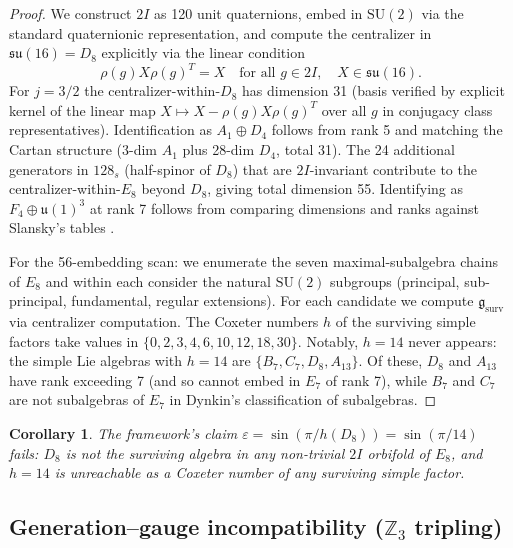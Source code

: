 \documentclass[11pt,a4paper]{amsart}
\newtheorem{corollary}[theorem]{Corollary}
\theoremstyle{definition}
\theoremstyle{remark}
\newcommand{\SU}{\mathrm{SU}}
\newcommand{\bbZ}{\mathbb{Z}}
\newcommand{\frakg}{\mathfrak{g}}
\newcommand{\fraks}{\mathfrak{s}}
\newcommand{\fraku}{\mathfrak{u}}
\begin{document}
\begin{proof}
We construct $2I$ as 120 unit quaternions, embed in $\SU(2)$ via the standard
quaternionic representation, and compute the centralizer in $\fraks\fraku(16) = D_8$
explicitly via the linear condition
\[ \rho(g) X \rho(g)^T = X \quad \text{for all } g \in 2I, \quad X \in \fraks\fraku(16). \]
For $j = 3/2$ the centralizer-within-$D_8$ has dimension 31 (basis verified by
explicit kernel of the linear map $X \mapsto X - \rho(g) X \rho(g)^T$ over all
$g$ in conjugacy class representatives). Identification as $A_1 \oplus D_4$
follows from rank 5 and matching the Cartan structure (3-dim $A_1$ plus
28-dim $D_4$, total 31). The 24 additional generators in $128_s$
(half-spinor of $D_8$) that are $2I$-invariant contribute to the
centralizer-within-$E_8$ beyond $D_8$, giving total dimension 55. Identifying
as $F_4 \oplus \fraku(1)^3$ at rank 7 follows from comparing dimensions and
ranks against Slansky's tables \cite{Slansky1981}.

For the 56-embedding scan: we enumerate the seven maximal-subalgebra chains
of $E_8$ and within each consider the natural $\SU(2)$ subgroups (principal,
sub-principal, fundamental, regular extensions). For each candidate we
compute $\frakg_{\mathrm{surv}}$ via centralizer computation. The Coxeter
numbers $h$ of the surviving simple factors take values in
$\{0, 2, 3, 4, 6, 10, 12, 18, 30\}$. Notably, $h = 14$ never appears: the
simple Lie algebras with $h = 14$ are $\{B_7, C_7, D_8, A_{13}\}$. Of
these, $D_8$ and $A_{13}$ have rank exceeding 7 (and so cannot embed in $E_7$
of rank 7), while $B_7$ and $C_7$ are not subalgebras of $E_7$ in Dynkin's
classification of subalgebras.
\end{proof}

\begin{corollary}\label{cor:wall1-eps}
The framework's claim
$\varepsilon = \sin(\pi/h(D_8)) = \sin(\pi/14)$ fails: $D_8$ is not the
surviving algebra in any non-trivial $2I$ orbifold of $E_8$, and
$h = 14$ is unreachable as a Coxeter number of any surviving simple factor.
\end{corollary}

\subsection{Generation--gauge incompatibility ($\bbZ_3$ tripling)}
\end{document}
